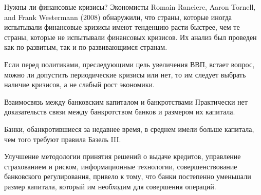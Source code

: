 \documentclass[_Banking_p1.tex]{subfiles}
\begin{document}
\begin{frame}{Нужны ли финансовые кризисы?}
Экономисты Romain Ranciere, Aaron Tornell, and Frank Westermann (2008) обнаружили, что страны, которые иногда испытывали финансовые кризисы имеют тенденцию расти быстрее, чем те страны, которые не испытывали финансовых кризисов. Их анализ был проведен как по развитым, так и по развивающимся странам.

Если перед политиками, преследующими цель увеличения ВВП, встает вопрос, можно ли допустить периодические кризисы или нет, то им следует выбрать наличие кризисов, а не слабый рост экономики.

\end{frame}

\begin{frame}[ allowframebreaks ]{\setfontsize{12pt}Взаимосвязь между банковским капиталом и банкротствами}
Практически нет доказательств связи между банкротством банков  и размером их капитала. 

Банки, обанкротившиеся за недавнее время, в среднем имели больше капитала, чем того требуют правила Базель III.

\pagebreak
Улучшение методологии принятия решений о выдаче кредитов, управление страхованием и риском, информационные технологии, совершенствование банковского регулирования, привело к тому, что банки постепенно уменьшали размер капитала, который им необходим для совершения операций.

\end{frame}
\end{document}
